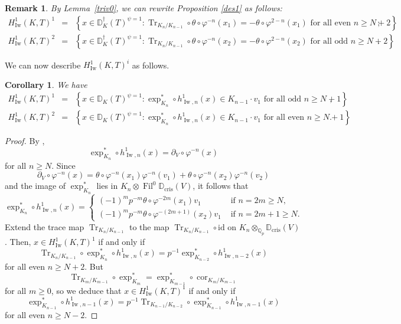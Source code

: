 \documentclass{amsart}
\newcommand{\QQ}{\mathbb Q}
\newcommand{\DD}{\mathbb D}
\DeclareMathOperator{\Tr}{Tr}
\DeclareMathOperator{\Iw}{Iw}
\DeclareMathOperator{\cris}{cris}
\DeclareMathOperator{\cor}{cor}
\DeclareMathOperator{\Fil}{Fil}
\newcommand{\Qp}{\QQ_p}
\newcommand{\vp}{\varphi}
\newtheorem{corollary}[theorem]{Corollary}
\newtheorem{remark}[theorem]{Remark}
\begin{document}
  \begin{remark}
   By Lemma~\ref{triv0}, we can rewrite Proposition \ref{des1} as follows:
   \begin{eqnarray*}
    H^1_{\Iw}(K,T)^1&=&\left\{x\in \DD^\dagger_K(T)^{\psi=1}:\Tr_{K_n/K_{n-1}}\circ\theta\circ\vp^{-n}(x_1)=-\theta\circ\vp^{2-n}(x_1)\text{ for all even }n\ge N+2\right\};\\
    H^1_{\Iw}(K,T)^2&=&\left\{x\in \DD^\dagger_K(T)^{\psi=1}:\Tr_{K_n/K_{n-1}}\circ\theta\circ\vp^{-n}(x_2)=-\theta\circ\vp^{2-n}(x_2)\text{ for all odd }n\ge N+2\right\}.
   \end{eqnarray*}
  \end{remark}

  We can now describe $H^1_{\Iw}(K,T)^i$ as follows.

  \begin{corollary}\label{trace}
   We have
   \begin{eqnarray*}
    H^1_{\Iw}(K,T)^1&=&\left\{x\in \DD_K(T)^{\psi=1}:\exp^*_{K_n}\circ h^1_{\Iw,n}(x)\in K_{n-1}\cdot v_1\text{ for all odd }n\ge N+1\right\},\\
    H^1_{\Iw}(K,T)^2&=&\left\{x\in \DD_K(T)^{\psi=1}:\exp^*_{K_n}\circ h^1_{\Iw,n}(x)\in K_{n-1}\cdot v_1\text{ for all even }n\ge N+1\right\}.
   \end{eqnarray*}
  \end{corollary}
  \begin{proof}
   By \cite[Th\'eor\`eme IV.2.1]{cherbonniercolmez99}, 
   \[ \exp^*_{K_n}\circ h^1_{\Iw,n}(x)= \partial_V\circ \vp^{-n}(x)\]
   for all $n\geq N$. Since
   \[ \partial_V\circ \vp^{-n}(x)=\theta\circ\vp^{-n}(x_1)\vp^{-n}(v_1)+\theta\circ\vp^{-n}(x_2)\vp^{-n}(v_2)\]
    and the image of $\exp^*_{K_n}$ lies in $K_n\otimes{\Fil}^0\DD_{\cris}(V)$, it follows that 
   \[ \exp^*_{K_n}\circ h^1_{\Iw,n}(x)=
    \begin{cases}
    (-1)^mp^{-m}\theta\circ\vp^{-2m}(x_1)v_1 & \text{ if $n=2m\ge N$}, \\
    (-1)^mp^{-m}\theta\circ\vp^{-(2m+1)}(x_2)v_1 & \text{ if $n=2m+1\ge N$}.
    \end{cases}
   \]
   Extend the trace map $\Tr_{K_n/K_{n-1}}$ to the map $\Tr_{K_n/K_{n-1}}\circ\mathrm{id}$ on $K_n\otimes_{\Qp}\DD_{\cris}(V)$. Then, $x\in H^1_{\Iw}(K,T)^1$ if and only if
   \[
   \Tr_{K_n/K_{n-1}}\circ\exp^*_{K_n}\circ h^1_{\Iw,n}(x)=p^{-1}\exp^*_{K_{n-2}}\circ h^1_{\Iw,{n-2}}(x)
   \]
   for all even $n\ge N+2$. But 
   \[
   \Tr_{K_m\slash K_{m-1}}\circ \exp^*_{K_{m}} =\exp^*_{K_{m-1}}\circ {\cor}_{K_m\slash K_{m-1}}
   \]
   for all $m\ge0$, so we deduce that $x\in H^1_{\Iw}(K,T)^1$ if and only if
   \[
   \exp^*_{K_{n-1}}\circ h^1_{\Iw,n-1}(x)=p^{-1}\Tr_{K_{n-1}/K_{n-2}}\circ\exp^*_{K_{n-1}}\circ h^1_{\Iw,n-1}(x)
   \]
   for all even $n\ge N-2$. 
  \end{proof}
 
\end{document}
